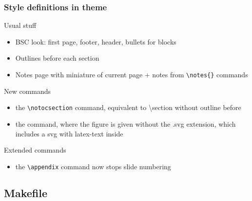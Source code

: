 \documentclass[c,12pt]{beamer}
\begin{document}
\begin{frame}[fragile]
	\frametitle{Style definitions in theme}
	\begin{block}{Usual stuff}
		\begin{itemize}
			\item BSC look: first page, footer, header, bullets for blocks
			\item Outlines before each section
			\item Notes page with miniature of current page + notes from \verb|\notes{}| commands
		\end{itemize}
	\end{block}
	\pause
	\begin{block}{New commands}
		\begin{itemize}
			\item the \verb|\notocsection| command, equivalent to \textbackslash section without outline before
			\item the \verb|| command, where the figure is given without the .svg extension, which includes a svg with latex-text inside
		\end{itemize}
	\end{block}
	\pause
	\begin{block}{Extended commands}
		\begin{itemize}
			\item the \verb|\appendix| command now stops slide numbering
		\end{itemize}
	\end{block}
\end{frame}

\subsection{Makefile}
\end{document}

